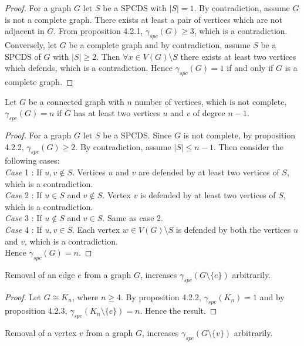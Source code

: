 \begin{proof}
For a graph $G$ let $S$ be a SPCDS with $|S|=1$. By contradiction, assume $G$ is not a complete graph. There exists at least a pair of vertices which are not adjacent in $G$. From proposition 4.2.1, $\gamma_{spc}(G) \geq 3$, which is a contradiction. Conversely, let $G$ be a complete graph and by contradiction, assume $S$ be a SPCDS of $G$ with $|S| \geq 2 $. Then $\forall x \in V(G)\setminus S$ there exists at least two vertices which defends, which is a contradiction. Hence $\gamma_{spc}(G)=1$ if and only if $G$ is a complete graph.
\end{proof}
\begin{proposition}
Let $G$ be a connected graph with $n$ number of vertices, which is not complete, $\gamma_{spc}(G)=n$ if $G$ has at least two vertices $u$ and $v$ of degree $n-1$.
\end{proposition}  
\begin{proof}
For a graph $G$ let $S$ be a SPCDS. Since $G$ is not complete, by proposition 4.2.2, $\gamma_{spc}(G) \geq 2$. By contradiction, assume $|S| \leq n-1$. Then consider the following cases:\\
\textit{Case }1 : If $u,v \notin S$. Vertices $u$ and $v$ are defended by at least two vertices of $S$, which is a contradiction.\\
\textit{Case }2 : If $u \in S$ and $v \notin S$. Vertex $v$ is defended by at least two vertices of $S$, which is a contradiction.\\
\textit{Case }3 : If $u \notin S$ and $v \in S$. Same as case 2.\\
\textit{Case }4 : If $u ,v \in S$. Each vertex $w \in V(G)\setminus S$ is defended by both the vertices $u$ and $v$, which is a contradiction.\\
Hence $\gamma_{spc}(G)=n$.
\end{proof}
\begin{proposition}
Removal of an edge $e$ from a graph $G$, increases $\gamma_{spc}(G \setminus \lbrace e \rbrace)$ arbitrarily.
\end{proposition}
\begin{proof}
Let $G \cong K_n$, where $n \geq 4$. By proposition 4.2.2, $\gamma_{spc}(K_n) = 1$ and by proposition 4.2.3, $\gamma_{spc}(K_n \setminus \lbrace e \rbrace) = n$. Hence the result.
\end{proof}
\begin{proposition}
Removal of a vertex $v$ from a graph $G$, increases $\gamma_{spc}(G\setminus \lbrace v \rbrace)$ arbitrarily.
\end{proposition}
